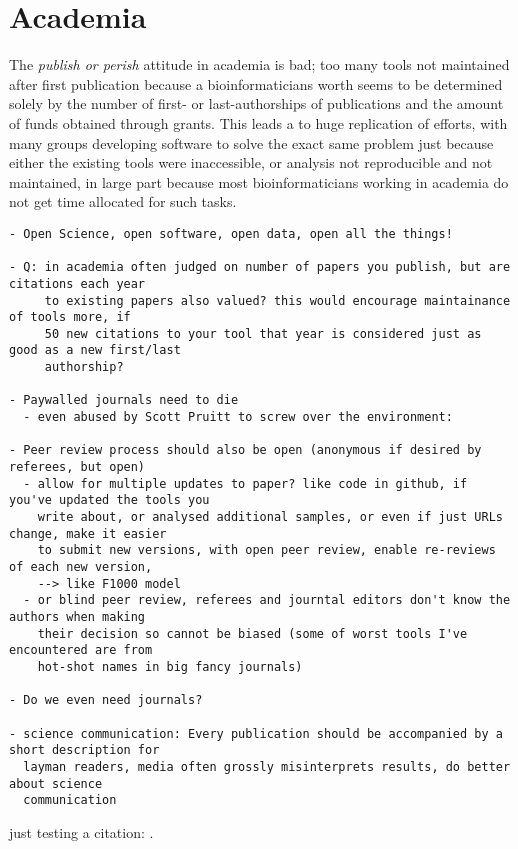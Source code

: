 \section{Academia}

The \textit{publish or perish} attitude in academia is bad; too many tools not maintained after first publication because a bioinformaticians worth seems to be determined solely by the number of first- or last-authorships of publications and the amount of funds obtained through grants. This leads a to huge replication of efforts, with many groups developing software to solve the exact same problem just because either the existing tools were inaccessible, or analysis not reproducible and not maintained, in large part because most bioinformaticians working in academia do not get time allocated for such tasks.

\begin{verbatim}
- Open Science, open software, open data, open all the things!

- Q: in academia often judged on number of papers you publish, but are citations each year
     to existing papers also valued? this would encourage maintainance of tools more, if
     50 new citations to your tool that year is considered just as good as a new first/last
     authorship?

- Paywalled journals need to die
  - even abused by Scott Pruitt to screw over the environment:

- Peer review process should also be open (anonymous if desired by referees, but open)
  - allow for multiple updates to paper? like code in github, if you've updated the tools you
    write about, or analysed additional samples, or even if just URLs change, make it easier
    to submit new versions, with open peer review, enable re-reviews of each new version,
    --> like F1000 model
  - or blind peer review, referees and journtal editors don't know the authors when making
    their decision so cannot be biased (some of worst tools I've encountered are from
    hot-shot names in big fancy journals)

- Do we even need journals?

- science communication: Every publication should be accompanied by a short description for
  layman readers, media often grossly misinterprets results, do better about science
  communication
\end{verbatim}

just testing a citation: \cite{hiltemann2014ireport}.



